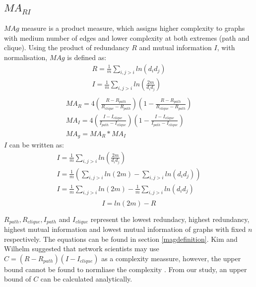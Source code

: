 \documentclass[12pt]{article}
\begin{document}
\subsection{$MA_{RI}$}
$MAg$ measure is a product measure, which assigns higher complexity to graphs with medium number of edges and lower complexity at both extremes (path and clique). Using the product of redundancy $R$ and mutual information $I$, with normalisation, $MAg$ is defined as\cite{KIM20082637}:
\begin{equation}
    \label{eq:RandI}
    \begin{gathered}
        R = \frac{1}{m}\sum_{i,j>i}ln(d_id_j)\\
        I = \frac{1}{m}\sum_{i,j>i}ln(\frac{2m}{d_id_j})\\
    \end{gathered}
\end{equation}
\begin{equation}
    \label{eq:mag}
    \begin{gathered}
        MA_R = 4(\frac{R-R_{path}}{R_{clique}-R_{path}})(1-\frac{R-R_{path}}{R_{clique}-R_{path}})\\
        MA_I = 4(\frac{I-I_{clique}}{I_{path}-I_{clique}})(1-\frac{I-I_{clique}}{I_{path}-I_{clique}})\\
        MA_g = MA_R * MA_I
    \end{gathered}
\end{equation}
$I$ can be written as:
\begin{equation}
    \begin{gathered}
        \label{eq:rewriteI}
        I = \frac{1}{m}\sum_{i,j>i}ln(\frac{2m}{d_id_j})\\
        I = \frac{1}{m}(\sum_{i,j>i}ln(2m)-\sum_{i,j>i}ln(d_id_j))\\
        I = \frac{1}{m}\sum_{i,j>i}ln(2m)-\frac{1}{m}\sum_{i,j>i}ln(d_id_j)\\
    \end{gathered}
\end{equation}
\begin{equation}
    \label{eq:mutual_info}
    I = ln(2m)-R
\end{equation}
\par
$R_{path},R_{clique},I_{path}$ and $I_{clique}$ represent the lowest redundacy, highest redundancy, highest mutual information and lowest mutual information of graphs with fixed $n$ respectively. The equations can be found in section \ref{magdefinition}. Kim and Wilhelm suggested that network scientists may use $C=(R-R_{path})(I-I_{clique})$ as a complexity meassure, however, the upper bound cannot be found to normliase the complexity \cite{KIM20082637}. From our study, an upper bound of $C$ can be calculated analytically.\par
\end{document}
